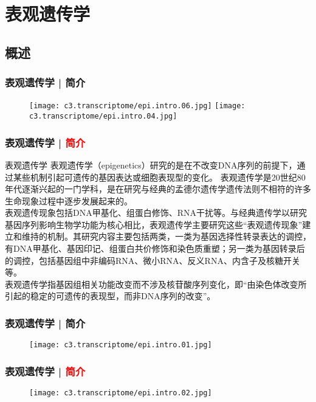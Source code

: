 \section{表观遗传学}
\subsection{概述}
\begin{frame}
  \frametitle{表观遗传学 | 简介}
  \begin{figure}
    \centering
    \texttt{[image: c3.transcriptome/epi.intro.06.jpg]}
    \texttt{[image: c3.transcriptome/epi.intro.04.jpg]}
  \end{figure}
\end{frame}

\begin{frame}
  \frametitle{表观遗传学 | \textcolor{red}{简介}}
  \begin{block}{表观遗传学}
表观遗传学（epigenetics）研究的是在不改变DNA序列的前提下，通过某些机制引起可遗传的基因表达或细胞表现型的变化。 表观遗传学是20世纪80年代逐渐兴起的一门学科，是在研究与经典的孟德尔遗传学遗传法则不相符的许多生命现象过程中逐步发展起来的。\\
\vspace{1em}
表观遗传现象包括DNA甲基化、组蛋白修饰、RNA干扰等。与经典遗传学以研究基因序列影响生物学功能为核心相比，表观遗传学主要研究这些“表观遗传现象”建立和维持的机制。其研究内容主要包括两类，一类为基因选择性转录表达的调控，有DNA甲基化、基因印记、组蛋白共价修饰和染色质重塑；另一类为基因转录后的调控，包括基因组中非编码RNA、微小RNA、反义RNA、内含子及核糖开关等。\\
\vspace{1em}
表观遗传学指基因组相关功能改变而不涉及核苷酸序列变化，即“由染色体改变所引起的稳定的可遗传的表现型，而非DNA序列的改变”。
  \end{block}
\end{frame}

\begin{frame}
  \frametitle{表观遗传学 | 简介}
  \begin{figure}
    \centering
    \texttt{[image: c3.transcriptome/epi.intro.01.jpg]}
  \end{figure}
\end{frame}

\begin{frame}
  \frametitle{表观遗传学 | \textcolor{red}{简介}}
  \begin{figure}
    \centering
    \texttt{[image: c3.transcriptome/epi.intro.02.jpg]}
  \end{figure}
\end{frame}

